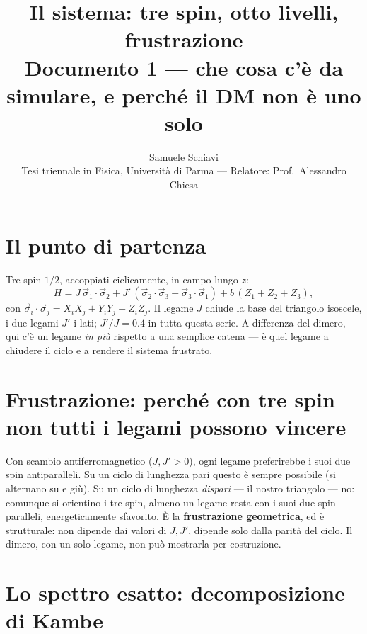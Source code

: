 \documentclass[11pt,a4paper]{article}
\title{\bfseries Il sistema: tre spin, otto livelli, frustrazione\\[2pt]
\large Documento 1 --- che cosa c'è da simulare, e perché il DM non è uno solo}
\author{Samuele Schiavi \\ \small Tesi triennale in Fisica, Università di Parma
--- Relatore: Prof.\ Alessandro Chiesa}
\date{}
\begin{document}
\maketitle
\thispagestyle{fancy}

\section{Il punto di partenza}

Tre spin $1/2$, accoppiati ciclicamente, in campo lungo $z$:
\begin{equation}
H = J\,\vec\sigma_1\!\cdot\!\vec\sigma_2 +
J'\,(\vec\sigma_2\!\cdot\!\vec\sigma_3+\vec\sigma_3\!\cdot\!\vec\sigma_1) +
b\,(Z_1{+}Z_2{+}Z_3),
\label{eq:H}
\end{equation}
con $\vec\sigma_i\cdot\vec\sigma_j=X_iX_j+Y_iY_j+Z_iZ_j$. Il legame $J$ chiude
la base del triangolo isoscele, i due legami $J'$ i lati; $J'/J=0.4$ in tutta
questa serie. A differenza del dimero, qui c'è un legame \emph{in più}
rispetto a una semplice catena --- è quel legame a chiudere il ciclo e a
rendere il sistema frustrato.

\section{Frustrazione: perché con tre spin non tutti i legami possono vincere}

Con scambio antiferromagnetico ($J,J'>0$), ogni legame preferirebbe i suoi
due spin antiparalleli. Su un ciclo di lunghezza pari questo è sempre
possibile (si alternano su e giù). Su un ciclo di lunghezza \emph{dispari}
--- il nostro triangolo --- no: comunque si orientino i tre spin, almeno un
legame resta con i suoi due spin paralleli, energeticamente sfavorito. È la
\textbf{frustrazione geometrica}, ed è strutturale: non dipende dai valori di
$J,J'$, dipende solo dalla parità del ciclo. Il dimero, con un solo legame,
non può mostrarla per costruzione.

\section{Lo spettro esatto: decomposizione di Kambe}
\end{document}
